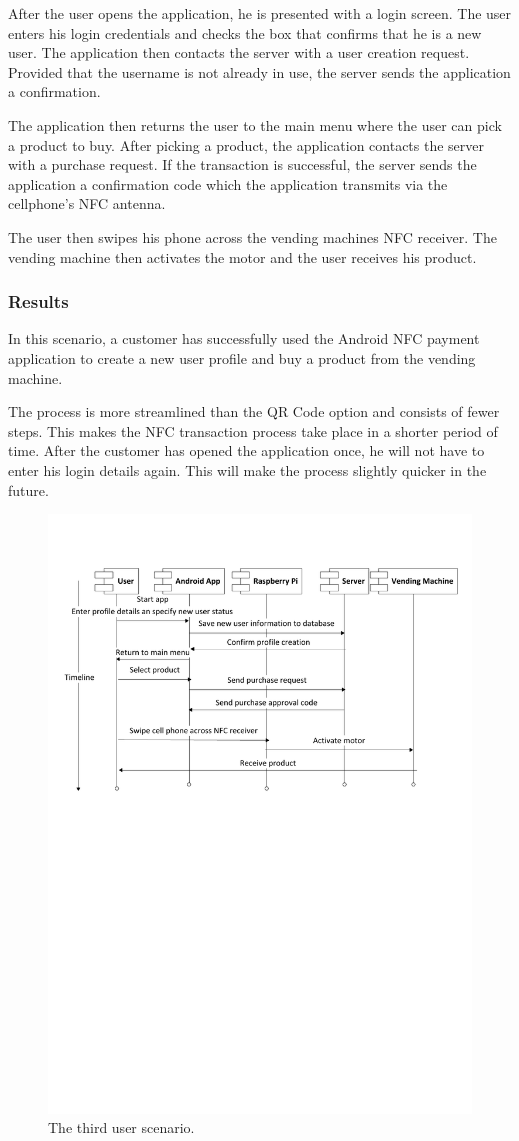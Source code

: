 After the user opens the application, he is presented with a login screen. The
user enters his login credentials and checks the box that confirms that he is a
new user. The application then contacts the server with a user creation
request. Provided that the username is not already in use, the server sends the
application a confirmation.

The application then returns the user to the main menu where the user can pick
a product to buy. After picking a product, the application contacts the server
with a purchase request. If the transaction is successful, the server sends the
application a confirmation code which the application transmits via the
cellphone's NFC antenna.

The user then swipes his phone across the vending machines NFC receiver. The
vending machine then activates the motor and the user receives his product. 

\subsubsection{Results}

In this scenario, a customer has successfully used the Android NFC payment application to
create a new user profile and buy a product from the vending machine. 

The process is more streamlined than the QR Code option and consists of fewer steps. This
makes the NFC transaction process take place in a shorter period of time. After the
customer has opened the application once, he will not have to enter his login details
again. This will make the process slightly quicker in the future.  

\begin{figure}
 \centering 
 \includegraphics[clip=true, trim = 0 450 0 70,
 scale=0.7]{user_story_3}
 \caption{The third user scenario.}
 \label{fig:test3}
\end{figure}